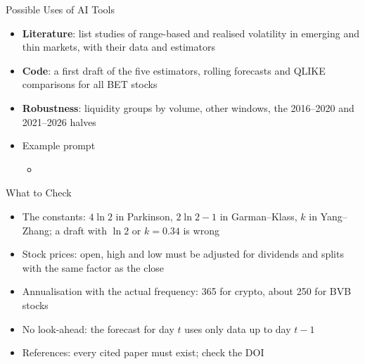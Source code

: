 \begin{frame}{Possible Uses of AI Tools}
\itemsize{\small}
\begin{itemize}
    \item \textbf{Literature}: list studies of range-based and realised volatility in emerging and thin markets, with their data and estimators
    \item \textbf{Code}: a first draft of the five estimators, rolling forecasts and QLIKE comparisons for all BET stocks
    \item \textbf{Robustness}: liquidity groups by volume, other windows, the 2016--2020 and 2021--2026 halves
    \item Example prompt
    \begin{itemize}
        \item {}
    \end{itemize}
\end{itemize}
\end{frame}

\begin{frame}{What to Check}
\itemsize{\small}
\begin{itemize}
    \item The constants: $4\ln 2$ in Parkinson, $2\ln 2 - 1$ in Garman--Klass, $k$ in Yang--Zhang; a draft with $\ln 2$ or $k = 0.34$ is wrong
    \item Stock prices: open, high and low must be adjusted for dividends and splits with the same factor as the close
    \item Annualisation with the actual frequency: 365 for crypto, about 250 for BVB stocks
    \item No look-ahead: the forecast for day $t$ uses only data up to day $t-1$
    \item References: every cited paper must exist; check the DOI
\end{itemize}
\end{frame}

